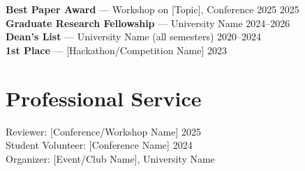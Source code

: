 \documentclass[11pt,letterpaper]{article}
\begin{document}
\textbf{Best Paper Award} — Workshop on [Topic], Conference 2025 \hfill 2025 \\
\textbf{Graduate Research Fellowship} — University Name \hfill 2024--2026 \\
\textbf{Dean's List} — University Name (all semesters) \hfill 2020--2024 \\
\textbf{1st Place} — [Hackathon/Competition Name] \hfill 2023

\section{Professional Service}

Reviewer: [Conference/Workshop Name] 2025 \\
Student Volunteer: [Conference Name] 2024 \\
Organizer: [Event/Club Name], University Name
\end{document}
